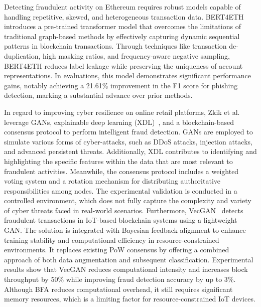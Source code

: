 \documentclass[5p,twocolumn]{elsarticle}
\begin{document}
Detecting fraudulent activity on Ethereum requires robust models capable of handling repetitive, skewed, and heterogeneous transaction data. BERT4ETH~\cite{hu2023bert4eth} introduces a pre-trained transformer model that overcomes the limitations of traditional graph-based methods by effectively capturing dynamic sequential patterns in blockchain transactions. Through techniques like transaction de-duplication, high masking ratios, and frequency-aware negative sampling, BERT4ETH reduces label leakage while preserving the uniqueness of account representations. In evaluations, this model demonstrates significant performance gains, notably achieving a 21.61\% improvement in the F1 score for phishing detection, marking a substantial advance over prior methods.

In regard to improving cyber resilience on online retail platforms, Zkik et al.~\cite{zkik2024cyber} leverage GANs, explainable deep learning (XDL)~\cite{la2023state}, and a blockchain-based consensus protocol to perform intelligent fraud detection. GANs are employed to simulate various forms of cyber-attacks, such as DDoS attacks, injection attacks, and advanced persistent threats. Additionally, XDL contributes to identifying and highlighting the specific features within the data that are most relevant to fraudulent activities. Meanwhile, the consensus protocol includes a weighted voting system and a rotation mechanism for distributing authoritative responsibilities among nodes. The experimental validation is conducted in a controlled environment, which does not fully capture the complexity and variety of cyber threats faced in real-world scenarios. Furthermore, VecGAN~\cite{rawlins2023predicting} detects fraudulent transactions in IoT-based blockchain systems using a lightweight GAN. The solution is integrated with Bayesian feedback alignment to enhance training stability and computational efficiency in resource-constrained environments. It replaces existing PoW consensus by offering a combined approach of both data augmentation and subsequent classification. Experimental results show that VecGAN reduces computational intensity and increases block throughput by 50\% while improving fraud detection accuracy by up to 3\%. Although BFA reduces computational overhead, it still requires significant memory resources, which is a limiting factor for resource-constrained IoT devices.
\end{document}

